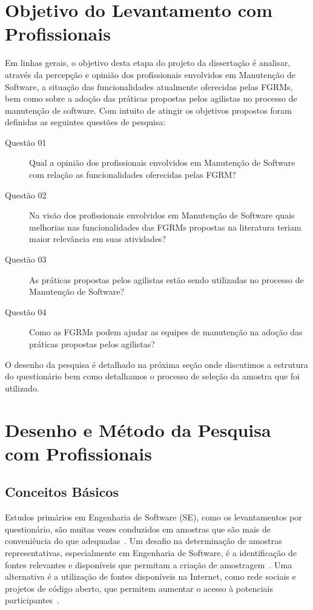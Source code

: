 \section{Objetivo do Levantamento com Profissionais}\label{sec:objetivo_da_pesquisa_com_profissionais}

Em linhas gerais, o objetivo desta etapa do projeto da dissertação é analisar,
através da percepção e opinião dos profissionais envolvidos em Manutenção de
Software, a situação das funcionalidades atualmente oferecidas pelas FGRMs, bem
como sobre a adoção das práticas propostas pelos agilistas no processo de
manutenção de software. Com intuito de atingir os objetivos propostos foram
definidas as seguintes questões de pesquisa:

\begin{description}
	\item[Questão 01] Qual a opinião dos profissionais envolvidos em Manutenção
		de Software com relação as funcionalidades oferecidas pelas
		FGRM\@?
	\item[Questão 02] Na visão dos profissionais envolvidos em Manutenção de
        Software quais melhorias nas funcionalidades das FGRMs propostas na
        literatura teriam maior relevância em suas atividades?
	\item[Questão 03] As práticas propostas pelos agilistas estão sendo
        utilizadas no processo de Manutenção de Software?
    \item[Questão 04] Como as FGRMs podem ajudar as equipes de manutenção na
        adoção das práticas propostas pelos agilistas?
\end{description}

O desenho da pesquisa é detalhado na próxima seção onde discutimos a estrutura
do questionário bem como detalhamos o processo de seleção da amostra que foi
utilizado.

\section{Desenho e Método da Pesquisa com Profissionais}\label{sec:desenho_da_pesquisa_com_profissionais}

\subsection{Conceitos Básicos}

Estudos primários em Engenharia de Software (SE), como os levantamentos por
questionário, são muitas vezes conduzidos em amostras que são mais de
conveniência do que adequadas~\cite{sjoberg2005survey, dybaa2006systematic}. Um
desafio na determinação de amostras representativas, especialmente em
Engenharia de Software, é a identificação de fontes relevantes e disponíveis
que permitam a criação de amostragem~\cite{de2014towards}. Uma alternativa é a
utilização de fontes disponíveis na Internet, como rede sociais e projetos de
código aberto, que permitem aumentar o acesso à potenciais
participantes~\cite{de2013would}.

